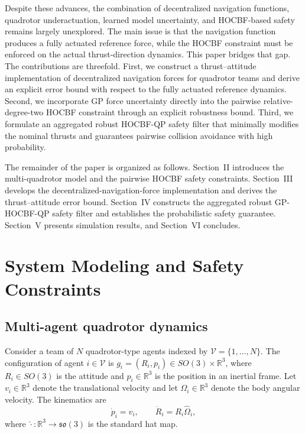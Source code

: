\documentclass[journal,twoside,web]{ieeecolor}
\newcommand{\R}{\mathbb{R}}
\begin{document}
Despite these advances, the combination of decentralized navigation
functions, quadrotor underactuation, learned model uncertainty, and
HOCBF-based safety remains largely unexplored. The main issue is that
the navigation function produces a fully actuated reference force, while
the HOCBF constraint must be enforced on the actual thrust-direction
dynamics. This paper bridges that gap. The contributions are threefold.
First, we construct a thrust--attitude implementation of decentralized
navigation forces for quadrotor teams and derive an explicit error bound
with respect to the fully actuated reference dynamics. Second, we
incorporate GP force uncertainty directly into the pairwise
relative-degree-two HOCBF constraint through an explicit robustness
bound. Third, we formulate an aggregated robust HOCBF-QP safety filter
that minimally modifies the nominal thrusts and guarantees
pairwise collision avoidance with high probability.

The remainder of the paper is organized as follows. Section~II
introduces the multi-quadrotor model and the pairwise HOCBF safety
constraints. Section~III develops the decentralized-navigation-force
implementation and derives the thrust--attitude error bound.
Section~IV constructs the aggregated robust GP-HOCBF-QP safety
filter and establishes the probabilistic safety guarantee. Section~V presents simulation results, and Section~VI concludes.

\section{System Modeling and Safety Constraints}
\label{sec:system_model}

\subsection{Multi-agent quadrotor dynamics}

Consider a team of $N$ quadrotor-type agents indexed by
$\mathcal V=\{1,\ldots,N\}$. The configuration of agent
$i\in\mathcal V$ is $g_i=(R_i,p_i)\in SO(3)\times\R^3$, where
$R_i\in SO(3)$ is the attitude and $p_i\in\mathbb R^3$ is
the position in an inertial frame. Let $v_i\in\mathbb R^3$
denote the translational velocity and let
$\Omega_i\in\mathbb R^3$ denote the body angular velocity.
The kinematics are
\begin{equation}
    \dot p_i=v_i,
    \qquad
    \dot R_i=R_i\widehat\Omega_i ,
    \label{eq:kinematics}
\end{equation}
where $\widehat{\cdot}:\mathbb R^3\to\mathfrak{so}(3)$ is
the standard hat map.
\end{document}
